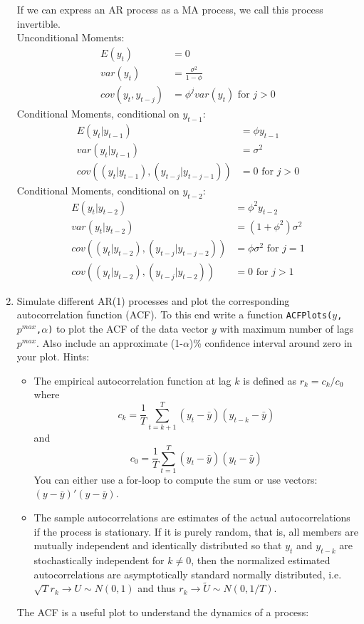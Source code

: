 \documentclass[a4paper]{scrartcl}
\begin{document}
\begin{enumerate}
\begin{solution}
\begin{itemize}
		\end{itemize}
		If we can express an AR process as a MA process, we call this process invertible.\\
		Unconditional Moments:
		\begin{align*}
			E(y_t) &= 0\\
			var(y_t) &= \frac{\sigma^2}{1-\phi}\\
			cov(y_t,y_{t-j}) &= \phi^j var(y_t) \text{ for } j>0
		\end{align*}
		Conditional Moments, conditional on $y_{t-1}$:
		\begin{align*}
		E(y_t|y_{t-1}) &= \phi y_{t-1}\\
		var(y_t|y_{t-1}) &= \sigma^2\\
		cov((y_t|y_{t-1}),(y_{t-j}|y_{t-j-1})) &= 0 \text{ for } j>0
		\end{align*}
		Conditional Moments, conditional on $y_{t-2}$:
		\begin{align*}
		E(y_t|y_{t-2}) &= \phi^2 y_{t-2}\\
		var(y_t|y_{t-2}) &= (1+\phi^2)\sigma^2\\
		cov((y_t|y_{t-2}),(y_{t-j}|y_{t-j-2})) &= \phi\sigma^2 \text{ for } j=1\\
		cov((y_t|y_{t-2}),(y_{t-j}|y_{t-2})) &= 0 \text{ for } j>1
		\end{align*}
		
	\end{solution}
	\item  Simulate different AR(1) processes and plot the corresponding autocorrelation function (ACF). To this end write a function \texttt{ACFPlots($y$,$p^{max}$,$\alpha$)} to plot the ACF of the data vector $y$ with maximum number of lags $p^{max}$. Also include an approximate (1-$\alpha$)\% confidence interval around zero in your plot. Hints: 
		 \begin{itemize}
		 	\item The empirical autocorrelation function at lag $k$ is defined as $r_k = c_k/c_0$ where
			$$c_k = \frac{1}{T} \sum_{t=k+1}^T (y_t - \bar{y})(y_{t-k}-\bar{y})$$ and $$c_0 = \frac{1}{T} \sum_{t=1}^T (y_t - \bar{y})(y_{t}-\bar{y})$$
			You can either use a for-loop to compute the sum or use vectors: $(y - \bar{y})'(y - \bar{y})$.
		 	\item The sample autocorrelations are estimates of the actual autocorrelations if the process is stationary. If it is purely random, that is, all members are mutually independent and identically distributed so that $y_t$  and $y_{t-k}$ are stochastically independent for $k\neq 0$, then the normalized estimated autocorrelations are asymptotically standard normally distributed, i.e. $\sqrt{T} r_k \rightarrow U \sim N(0,1)$ and thus $r_k \rightarrow \tilde{U} \sim N(0,1/T)$. 
		 \end{itemize}
	
	 \begin{solution}
		 The ACF is a useful plot to understand the dynamics of a process:
		 
		 \newpage
	 \end{solution}
\end{enumerate}
\newpage
\end{document}
